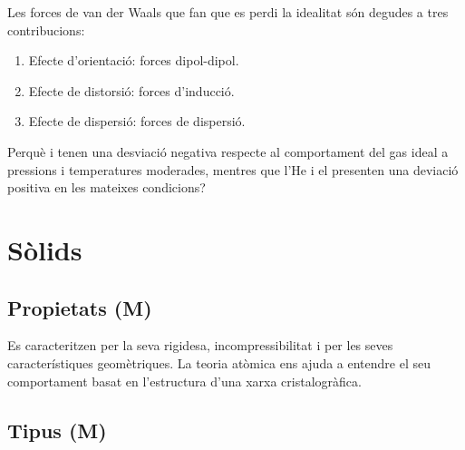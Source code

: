 Les forces de van der Waals que fan que es perdi la idealitat són degudes a tres contribucions:
\begin{enumerate}
\item Efecte d'orientació: forces dipol-dipol.
\item Efecte de distorsió: forces d'inducció.
\item Efecte de dispersió: forces de dispersió.
\end{enumerate}

\begin{exr}
Perquè  i  tenen una desviació negativa respecte al comportament del gas ideal a pressions i temperatures moderades, mentres que l'He i el  presenten una deviació positiva en les mateixes condicions?
\end{exr}





\section{Sòlids}
\subsection{Propietats (M)}

Es caracteritzen per la seva rigidesa, incompressibilitat i per les seves característiques geomètriques.
La teoria atòmica ens ajuda a entendre el seu comportament basat en l'estructura d'una xarxa cristalogràfica.



\subsection{Tipus (M)}

